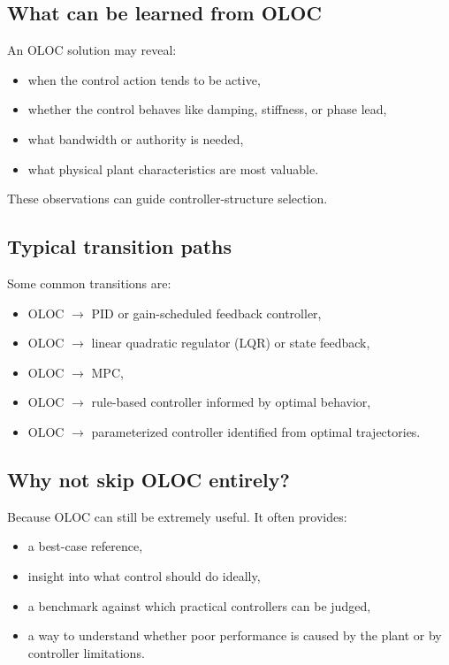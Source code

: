 \documentclass[11pt]{article}
\begin{document}
\subsection{What can be learned from OLOC}

An OLOC solution may reveal:
\begin{itemize}[leftmargin=1.4em]
  \item when the control action tends to be active,
  \item whether the control behaves like damping, stiffness, or phase lead,
  \item what bandwidth or authority is needed,
  \item what physical plant characteristics are most valuable.
\end{itemize}

These observations can guide controller-structure selection.

\subsection{Typical transition paths}

Some common transitions are:
\begin{itemize}[leftmargin=1.4em]
  \item OLOC $\rightarrow$ PID or gain-scheduled feedback controller,
  \item OLOC $\rightarrow$ linear quadratic regulator (LQR) or state feedback,
  \item OLOC $\rightarrow$ MPC,
  \item OLOC $\rightarrow$ rule-based controller informed by optimal behavior,
  \item OLOC $\rightarrow$ parameterized controller identified from optimal trajectories.
\end{itemize}

\subsection{Why not skip OLOC entirely?}

Because OLOC can still be extremely useful. It often provides:
\begin{itemize}[leftmargin=1.4em]
  \item a best-case reference,
  \item insight into what control should do ideally,
  \item a benchmark against which practical controllers can be judged,
  \item a way to understand whether poor performance is caused by the plant or by controller limitations.
\end{itemize}
\end{document}
